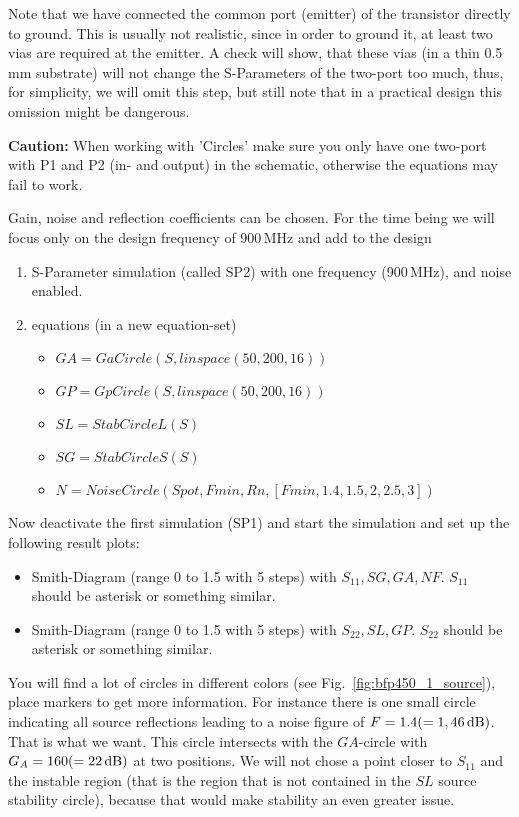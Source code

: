 Note that we have connected the common port (emitter) of the
transistor directly to ground. This is usually not realistic, since in
order to ground it, at least two vias are required at the emitter. A
check will show, that these vias (in a thin 0.5\,mm substrate) will
not change the S-Parameters of the two-port too much, thus, for
simplicity, we will omit this step, but still note that in a practical
design this omission might be dangerous.


\textbf{Caution:} When working with 'Circles' make sure you only have
one two-port with P1 and P2 (in- and output) in the schematic,
otherwise the equations may fail to work.

Gain, noise and reflection coefficients can be chosen. For the
time being we will focus only on the design frequency of 900\,MHz
and add to the design
\begin{enumerate}
\item S-Parameter simulation (called SP2) with one frequency (900\,MHz), and noise
  enabled.
\item equations (in a new equation-set)
  \begin{itemize}
  \item $GA=GaCircle(S,linspace(50,200,16))$
  \item $GP=GpCircle(S,linspace(50,200,16))$
  \item $SL=StabCircleL(S)$
  \item $SG=StabCircleS(S)$
  \item $N=NoiseCircle(Spot,Fmin,Rn,[Fmin,1.4,1.5,2,2.5,3])$
  \end{itemize}
\end{enumerate}
Now deactivate the first simulation (SP1) and start the simulation and
set up the following result plots:
\begin{itemize}
\item Smith-Diagram (range 0 to 1.5 with 5 steps) with
  $S_{11},SG,GA,NF$. $S_{11}$ should be asterisk or something similar.
\item Smith-Diagram (range 0 to 1.5 with 5 steps) with
  $S_{22},SL,GP$.  $S_{22}$ should be asterisk or something similar.
\end{itemize}
You will find a lot of circles in different colors (see
Fig.~\ref{fig:bfp450_1_source}), place markers to get more
information. For instance there is one small circle indicating all
source reflections leading to a noise figure of
$F=1.4(=1,46\,\mathrm{dB})$. That is what we want. This circle
intersects with the $GA$-circle with $G_A=160(=22\,\mathrm{dB})$ at two
positions. We will not chose a point closer to $S_{11}$ and the
instable region (that is the region that is not contained in the $SL$
source stability circle), because that would make stability an even
greater issue.

